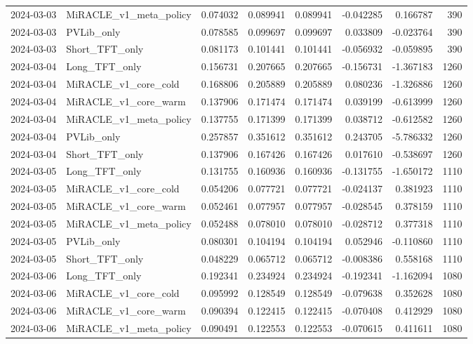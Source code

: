\begin{tabular}{llrrrrrr}
2024-03-03 & MiRACLE_v1_meta_policy & 0.074032 & 0.089941 & 0.089941 & -0.042285 & 0.166787 & 390 \\
2024-03-03 & PVLib_only & 0.078585 & 0.099697 & 0.099697 & 0.033809 & -0.023764 & 390 \\
2024-03-03 & Short_TFT_only & 0.081173 & 0.101441 & 0.101441 & -0.056932 & -0.059895 & 390 \\
2024-03-04 & Long_TFT_only & 0.156731 & 0.207665 & 0.207665 & -0.156731 & -1.367183 & 1260 \\
2024-03-04 & MiRACLE_v1_core_cold & 0.168806 & 0.205889 & 0.205889 & 0.080236 & -1.326886 & 1260 \\
2024-03-04 & MiRACLE_v1_core_warm & 0.137906 & 0.171474 & 0.171474 & 0.039199 & -0.613999 & 1260 \\
2024-03-04 & MiRACLE_v1_meta_policy & 0.137755 & 0.171399 & 0.171399 & 0.038712 & -0.612582 & 1260 \\
2024-03-04 & PVLib_only & 0.257857 & 0.351612 & 0.351612 & 0.243705 & -5.786332 & 1260 \\
2024-03-04 & Short_TFT_only & 0.137906 & 0.167426 & 0.167426 & 0.017610 & -0.538697 & 1260 \\
2024-03-05 & Long_TFT_only & 0.131755 & 0.160936 & 0.160936 & -0.131755 & -1.650172 & 1110 \\
2024-03-05 & MiRACLE_v1_core_cold & 0.054206 & 0.077721 & 0.077721 & -0.024137 & 0.381923 & 1110 \\
2024-03-05 & MiRACLE_v1_core_warm & 0.052461 & 0.077957 & 0.077957 & -0.028545 & 0.378159 & 1110 \\
2024-03-05 & MiRACLE_v1_meta_policy & 0.052488 & 0.078010 & 0.078010 & -0.028712 & 0.377318 & 1110 \\
2024-03-05 & PVLib_only & 0.080301 & 0.104194 & 0.104194 & 0.052946 & -0.110860 & 1110 \\
2024-03-05 & Short_TFT_only & 0.048229 & 0.065712 & 0.065712 & -0.008386 & 0.558168 & 1110 \\
2024-03-06 & Long_TFT_only & 0.192341 & 0.234924 & 0.234924 & -0.192341 & -1.162094 & 1080 \\
2024-03-06 & MiRACLE_v1_core_cold & 0.095992 & 0.128549 & 0.128549 & -0.079638 & 0.352628 & 1080 \\
2024-03-06 & MiRACLE_v1_core_warm & 0.090394 & 0.122415 & 0.122415 & -0.070408 & 0.412929 & 1080 \\
2024-03-06 & MiRACLE_v1_meta_policy & 0.090491 & 0.122553 & 0.122553 & -0.070615 & 0.411611 & 1080 \\

\end{tabular}
